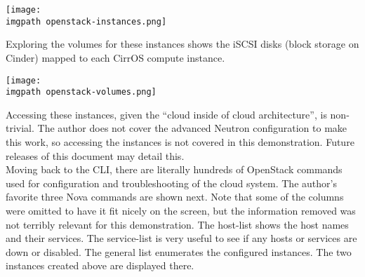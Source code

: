     \begin{minipage}[t]{\linewidth}
	  \centering
      \texttt{[image: \\imgpath openstack-instances.png]}
    \end{minipage}

Exploring the volumes for these instances shows the iSCSI disks (block storage
on Cinder) mapped to each CirrOS compute instance.

    \begin{minipage}[t]{\linewidth}
	  \centering
      \texttt{[image: \\imgpath openstack-volumes.png]}
    \end{minipage}

Accessing these instances, given the ``cloud inside of cloud architecture'',
is non-trivial. The author does not cover the advanced Neutron configuration
to make this work, so accessing the instances is not covered in this
demonstration. Future releases of this document may detail this. \\

Moving back to the CLI, there are literally hundreds of OpenStack commands
used for configuration and troubleshooting of the cloud system. The author’s
favorite three Nova commands are shown next. Note that some
of the columns were omitted to have it fit nicely on the screen, but the
information removed was not terribly relevant for this demonstration. The
host-list shows the host names and their services. The service-list is very
useful to see if any hosts or services are down or disabled. The general list
enumerates the configured instances. The two instances created above are
displayed there.

